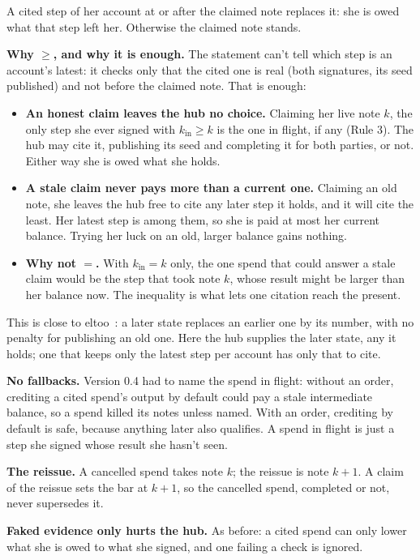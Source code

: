 \documentclass[11pt]{article}
\theoremstyle{plain}
\theoremstyle{definition}
\newcommand{\kin}{k_{\mathrm{in}}}
\begin{document}
A cited step of her account at or after the claimed note replaces it:
she is owed what that step left her. Otherwise the claimed note stands.

\textbf{Why $\ge$, and why it is enough.} The statement can't tell
which step is an account's latest: it checks only that the cited one is
real (both signatures, its seed published) and not before the claimed
note. That is enough:
\begin{itemize}[nosep]
\item \textbf{An honest claim leaves the hub no choice.} Claiming her
  live note $k$, the only step she ever signed with $\kin \ge k$ is the
  one in flight, if any (Rule 3). The hub may cite it, publishing its
  seed and completing it for both parties, or not. Either way she is
  owed what she holds.
\item \textbf{A stale claim never pays more than a current one.} Claiming
  an old note, she leaves the hub free to cite any later step it holds,
  and it will cite the least. Her latest step is among them, so she is
  paid at most her current balance. Trying her luck on an old, larger
  balance gains nothing.
\item \textbf{Why not $=$.} With $\kin = k$ only, the one spend that
  could answer a stale claim would be the step that took note $k$,
  whose result might be larger than her balance now. The inequality is
  what lets one citation reach the present.
\end{itemize}
This is close to eltoo~\cite{eltoo}: a later state replaces an earlier
one by its number, with no penalty for publishing an old one. Here the
hub supplies the later state, any it holds; one that keeps only the
latest step per account has only that to cite.

\textbf{No fallbacks.} Version 0.4 had to name the spend in flight:
without an order, crediting a cited spend's output by default could pay
a stale intermediate balance, so a spend killed its notes unless named.
With an order, crediting by default is safe, because anything later
also qualifies. A spend in flight is just a step she signed whose result
she hasn't seen.

\textbf{The reissue.} A cancelled spend takes note $k$; the reissue is
note $k + 1$. A claim of the reissue sets the bar at $k + 1$, so the
cancelled spend, completed or not, never supersedes it.

\textbf{Faked evidence only hurts the hub.} As before: a cited spend can
only lower what she is owed to what she signed, and one failing a check
is ignored.
\end{document}
